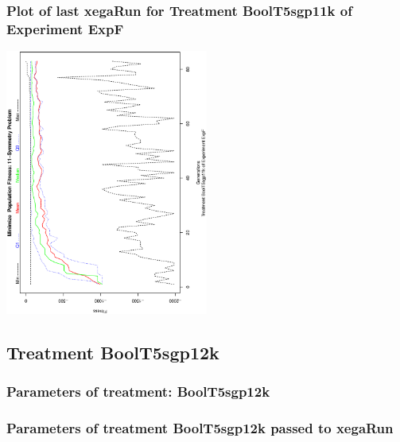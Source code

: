 \documentclass[18pt,c]{beamer}
\begin{document}
 \begin{frame}
 \frametitle{ Plot of last xegaRun for Treatment BoolT5sgp11k of Experiment ExpF }
 \begin{center}
\includegraphics[width=0.5\textwidth, angle=-90]
{ExpFPlotPopStatsFigure001.eps}
 \end{center}
 \label{report/ExpFPlotPopStatsFigure001.eps}  
 \end{frame}

\clearpage
\subsection{Treatment BoolT5sgp12k}

 \begin{frame}
 \fontsize{8pt}{9pt}\selectfont
 \frametitle{  Parameters of treatment: BoolT5sgp12k 
 }

 \label{ExpFtParmTable008.tex}  
 \end{frame}


 \begin{frame}
 \fontsize{8pt}{9pt}\selectfont
 \frametitle{  Parameters of treatment BoolT5sgp12k passed to xegaRun
 }

 \label{ExpFtParmTable009.tex}  
 \end{frame}
\end{document}
